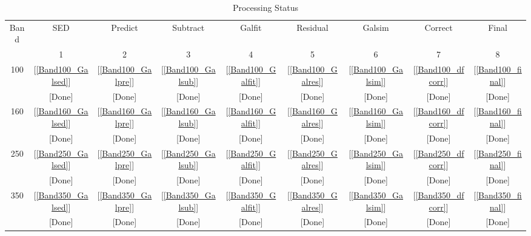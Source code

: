 \documentclass[11pt,a4paper]{article}
\begin{document}
\begin{table}[h]
	\caption{Processing Status}
	\begin{tabular}{ccccccccc}
		\hline
		\hline
		Band & SED & Predict & Subtract & Galfit & Residual & Galsim & Correct & Final \\
		& 1 & 2 & 3 & 4 & 5 & 6 & 7 & 8 \\
		\hline
		100 & [\ref{Band100_Galsed}] & [\ref{Band100_Galpre}] & [\ref{Band100_Galsub}] & [\ref{Band100_Galfit}] & [\ref{Band100_Galres}] & [\ref{Band100_Galsim}] & [\ref{Band100_dfcorr}] & [\ref{Band100_final}] \\
		& \textcolor{green!50!black}{[Done]} & \textcolor{green!50!black}{[Done]} & \textcolor{green!50!black}{[Done]} & \textcolor{green!50!black}{[Done]} & \textcolor{green!50!black}{[Done]} & \textcolor{green!50!black}{[Done]} & \textcolor{green!50!black}{[Done]} & \textcolor{green!50!black}{[Done]} \\
		160 & [\ref{Band160_Galsed}] & [\ref{Band160_Galpre}] & [\ref{Band160_Galsub}] & [\ref{Band160_Galfit}] & [\ref{Band160_Galres}] & [\ref{Band160_Galsim}] & [\ref{Band160_dfcorr}] & [\ref{Band160_final}] \\
		& \textcolor{green!50!black}{[Done]} & \textcolor{green!50!black}{[Done]} & \textcolor{green!50!black}{[Done]} & \textcolor{green!50!black}{[Done]} & \textcolor{green!50!black}{[Done]} & \textcolor{green!50!black}{[Done]} & \textcolor{green!50!black}{[Done]} & \textcolor{green!50!black}{[Done]} \\
		250 & [\ref{Band250_Galsed}] & [\ref{Band250_Galpre}] & [\ref{Band250_Galsub}] & [\ref{Band250_Galfit}] & [\ref{Band250_Galres}] & [\ref{Band250_Galsim}] & [\ref{Band250_dfcorr}] & [\ref{Band250_final}] \\
		& \textcolor{green!50!black}{[Done]} & \textcolor{green!50!black}{[Done]} & \textcolor{green!50!black}{[Done]} & \textcolor{green!50!black}{[Done]} & \textcolor{green!50!black}{[Done]} & \textcolor{green!50!black}{[Done]} & \textcolor{green!50!black}{[Done]} & \textcolor{green!50!black}{[Done]} \\
		350 & [\ref{Band350_Galsed}] & [\ref{Band350_Galpre}] & [\ref{Band350_Galsub}] & [\ref{Band350_Galfit}] & [\ref{Band350_Galres}] & [\ref{Band350_Galsim}] & [\ref{Band350_dfcorr}] & [\ref{Band350_final}] \\
		& \textcolor{green!50!black}{[Done]} & \textcolor{green!50!black}{[Done]} & \textcolor{green!50!black}{[Done]} & \textcolor{green!50!black}{[Done]} & \textcolor{green!50!black}{[Done]} & \textcolor{green!50!black}{[Done]} & \textcolor{green!50!black}{[Done]} & \textcolor{green!50!black}{[Done]} \\

\end{tabular}
\end{table}
\end{document}
